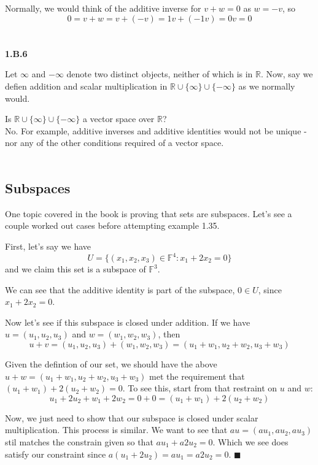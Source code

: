 Normally, we would think of the additive inverse for $v + w = 0$ as $w = -v$, so
$$
0 = v + w = v + (-v) = 1v + (-1v) = 0v = 0
$$
\\~\\



\textbf{1.B.6}

Let $\infty$ and $-\infty$ denote two distinct objects, neither of which is in $\mathbb{R}$.
Now, say we defien addition and scalar multiplication in $\mathbb{R}\cup\{\infty\}\cup\{-\infty\}$
as we normally would.

Is $\mathbb{R}\cup\{\infty\}\cup\{-\infty\}$ a vector space over $\mathbb{R}$?
\\

No.
For example, additive inverses and additive identities would not be unique - nor any of the other
conditions required of a vector space.
\\~\\




\subsection{Subspaces}

One topic covered in the book is proving that sets are subspaces.
Let's see a couple worked out cases before attempting example 1.35.

First, let's say we have
$$
U = \{ (x_1, x_2, x_3) \in \mathbb{F}^4 : x_1 + 2x_2 = 0 \}
$$
and we claim this set is a subspace of $\mathbb{F}^3$.

We can see that the additive identity is part of the subspace, $0\in U$, since $x_1 +2x_2 = 0$.

Now let's see if this subspace is closed under addition.
If we have $u = (u_1, u_2, u_3)$ and $w = (w_1, w_2, w_3)$, then
$$
u + v = (u_1, u_2, u_3) + (w_1, w_2, w_3) = (u_1+w_1, u_2+w_2, u_3+w_3)
$$

Given the defintion of our set, we should have the above $u + w = (u_1+w_1, u_2+w_2, u_3+w_3)$
met the requirement that $(u_1+w_1) + 2(u_2+w_2) = 0$.
To see this, start from that restraint on $u$ and $w$:
$$
u_1 + 2u_2 + w_1 + 2w_2 = 0 + 0 = (u_1 +w_1) + 2(u_2+w_2) 
$$

Now, we just need to show that our subspace is closed under scalar multiplication.
This process is similar.
We want to see that $au = (au_1, au_2, au_3)$ stil matches the constrain given so that
$au_1 + a2u_2 = 0$.
Which we see does satisfy our constraint since $a(u_1 + 2u_2) = au_1 = a2u_2 = 0$.
$\blacksquare$
\\~\\

